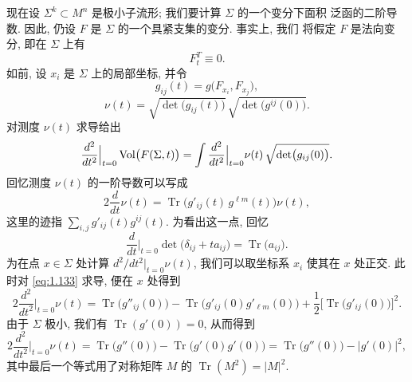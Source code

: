 现在设 $\Sigma^k\subset M^n$ 是极小子流形; 我们要计算 $\Sigma$ 的一个变分下面积
泛函的二阶导数. 因此, 仍设 $F$ 是 $\Sigma$ 的一个具紧支集的变分. 事实上, 我们
将假定 $F$ 是法向变分, 即在 $\Sigma$ 上有
\begin{equation}
F_t^{T}\equiv0.
\label{eq:1.129}
\end{equation}
如前, 设 $x_i$ 是 $\Sigma$ 上的局部坐标, 并令
\begin{equation}
g_{ij}(t)=g\bigl(F_{x_i},F_{x_j}\bigr),
\label{eq:1.130}
\end{equation}
\begin{equation}
\nu(t)=\sqrt{\det\bigl(g_{ij}(t)\bigr)}\,
 \sqrt{\det\bigl(g^{ij}(0)\bigr)}.
\label{eq:1.131}
\end{equation}
对测度 $\nu(t)$ 求导给出
\begin{equation}
\frac{d^{2}}{dt^{2}}\Big|_{t=0}\operatorname{Vol}\bigl(F(\Sigma,t)\bigr)
 =\int\frac{d^{2}}{dt^{2}}\Big|_{t=0}\nu(t)\,
 \sqrt{\det\bigl(g_{ij}(0)\bigr)}.
\label{eq:1.132}
\end{equation}
回忆测度 $\nu(t)$ 的一阶导数可以写成
\begin{equation}
2\frac{d}{dt}\nu(t)
 =\operatorname{Tr}\bigl(g'_{ij}(t)\,g^{\ell m}(t)\bigr)\nu(t),
\label{eq:1.133}
\end{equation}
这里的迹指 $\sum_{i,j}g'_{ij}(t)g^{ij}(t)$. 为看出这一点, 回忆
\begin{equation}
\frac{d}{dt}\Big|_{t=0}\det\bigl(\delta_{ij}+ta_{ij}\bigr)
 =\operatorname{Tr}\bigl(a_{ij}\bigr).
\label{eq:1.134}
\end{equation}
为在点 $x\in\Sigma$ 处计算 $d^{2}/dt^{2}|_{t=0}\nu(t)$, 我们可以取坐标系
$x_i$ 使其在 $x$ 处正交. 此时对 \eqref{eq:1.133} 求导, 便在 $x$ 处得到
\begin{equation}
2\frac{d^{2}}{dt^{2}}\Big|_{t=0}\nu(t)
 =\operatorname{Tr}\bigl(g''_{ij}(0)\bigr)
 -\operatorname{Tr}\bigl(g'_{ij}(0)g'_{\ell m}(0)\bigr)
 +\frac12\bigl[\operatorname{Tr}\bigl(g'_{ij}(0)\bigr)\bigr]^{2}.
\label{eq:1.135}
\end{equation}
由于 $\Sigma$ 极小, 我们有 $\operatorname{Tr}(g'(0))=0$, 从而得到
\begin{equation}
2\frac{d^{2}}{dt^{2}}\Big|_{t=0}\nu(t)
 =\operatorname{Tr}\bigl(g''(0)\bigr)
 -\operatorname{Tr}\bigl(g'(0)g'(0)\bigr)
 =\operatorname{Tr}\bigl(g''(0)\bigr)-|g'(0)|^{2},
\label{eq:1.136}
\end{equation}
其中最后一个等式用了对称矩阵 $M$ 的 $\operatorname{Tr}(M^{2})=|M|^{2}$.

